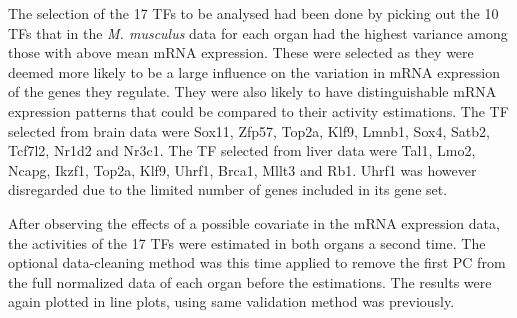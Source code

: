 The selection of the 17 \acp{TF} to be analysed had been done by picking out the 10 \acp{TF} that in the \textit{M. musculus} data for each organ had the highest variance among those with above mean mRNA expression. These were selected as they were deemed more likely to be a large influence on the variation in mRNA expression of the genes they regulate. They were also likely to have distinguishable mRNA expression patterns that could be compared to their activity estimations. The \ac{TF} selected from brain data were Sox11, Zfp57, Top2a, Klf9, Lmnb1, Sox4, Satb2, Tcf7l2, Nr1d2 and Nr3c1. The \ac{TF} selected from liver data were Tal1, Lmo2, Ncapg, Ikzf1, Top2a, Klf9, Uhrf1, Brca1, Mllt3 and Rb1. Uhrf1 was however disregarded due to the limited number of genes included in its gene set.

After observing the effects of a possible covariate in the mRNA expression data, the activities of the 17 \acp{TF} were estimated in both organs a second time. The optional data-cleaning method was this time applied to remove the first \ac{PC} from the full normalized data of each organ before the estimations. The results were again plotted in line plots, using same validation method was previously.
